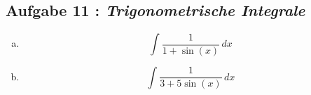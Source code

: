 \documentclass[11pt,a4paper,ngerman]{article}
\begin{document}
\subsection*{Aufgabe 11 : \mdseries\itshape Trigonometrische Integrale}

\begin{enumerate}[a.]
    \addtocounter{enumi}{6}
    \item
        $$
            \int \frac{1}{1+\sin (x)} \, dx
        $$
    
    \item
        $$
            \int \frac{1}{3 + 5 \sin (x)} \, dx
        $$
\end{enumerate}


\label{LastPage}
\end{document}
